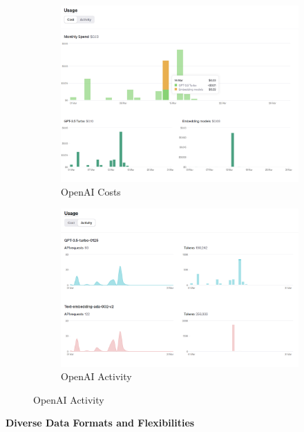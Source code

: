 \documentclass{l4proj}
\begin{document}
\begin{figure}[ht]
  \centering
  \begin{subfigure}[b]{0.495\textwidth}
    \includegraphics[width=\textwidth]{images/costopenai.png}
    \caption{OpenAI Costs}
  \end{subfigure}
  \hfill %
  \begin{subfigure}[b]{0.495\textwidth}
    \includegraphics[width=\textwidth]{images/usageopenai.png}
    \caption{OpenAI Activity}
  \end{subfigure}
\end{figure}

\textbf{Diverse Data Formats and Flexibilities}
\end{document}
